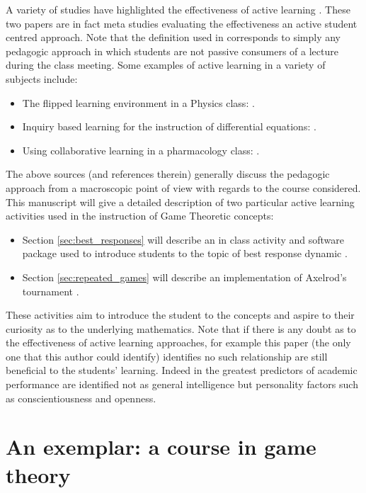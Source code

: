 \documentclass[12pt]{article}
\begin{document}
A variety of studies have highlighted the effectiveness of active learning
\cite{Freeman2014, Hake1998, Prince2004}. These two papers are in fact meta studies
evaluating the effectiveness an active student centred approach. Note that the
definition used in \cite{Freeman2014} corresponds to simply any pedagogic
approach in which students are not passive consumers of a lecture during the
class meeting. Some examples of active learning in a variety of subjects include:

\begin{itemize}
    \item The flipped learning environment in a Physics class: \cite{Bates}.
    \item Inquiry based learning for the instruction of differential equations:
        \cite{Kwon2005}.
    \item Using collaborative learning in a pharmacology class:
        \cite{Depaz2008}.
\end{itemize}

The above sources (and references therein) generally discuss the pedagogic
approach from a macroscopic point of view with regards to the course considered.
This manuscript will give a detailed description of two particular active
learning activities used in the instruction of Game Theoretic concepts:

\begin{itemize}
    \item Section \ref{sec:best_responses} will describe an in class activity
        and software package used to introduce students to the topic of best
        response dynamic \cite{Maschler2013}.
    \item Section \ref{sec:repeated_games} will describe an implementation of
        Axelrod's tournament \cite{Axelrod1980a, Axelrod1980b}.
\end{itemize}

These activities aim to introduce the student to the concepts and aspire to
their curiosity as to the underlying mathematics. Note that if there is any
doubt as to the effectiveness of active learning approaches, for example this paper
(the only one that this author could identify) \cite{Andrews2011} identifies no
such relationship are still beneficial to the students' learning.
Indeed in \cite{Poropat2014}  the greatest predictors of
academic performance are identified not as general intelligence \cite{Wright1905} but
personality factors such as conscientiousness and openness.

\section{An exemplar: a course in game theory}\label{sec:game_theory}
\end{document}
